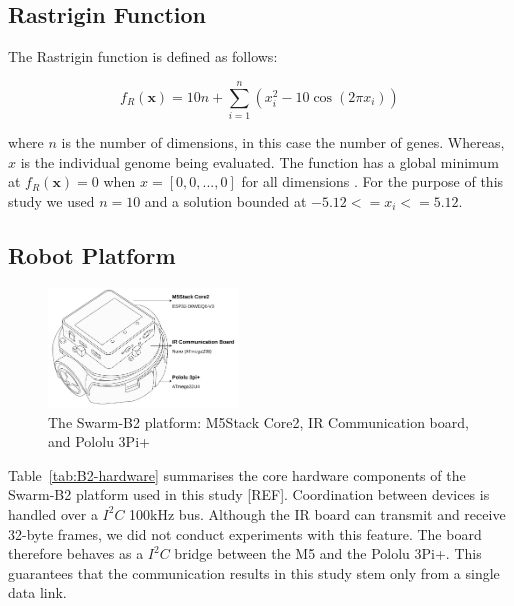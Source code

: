\documentclass[conference]{IEEEtran}
\begin{document}
\subsection{Rastrigin Function}

The Rastrigin function is defined as follows:

\begin{equation}\label{eq:rastrigin}
f_R(\mathbf{x}) = 10n + \sum_{i=1}^{n} \left(x_i^2 - 10\cos(2\pi x_i)\right)
\end{equation}

where $n$ is the number of dimensions, in this case the number of genes. Whereas, $x$ is the individual genome being evaluated. The function has a global minimum at \( f_R(\mathbf{x}) = 0 \) when $x = [0, 0, ..., 0]$ for all dimensions \cite{rucinski_impact_2010}. For the purpose of this study we used $n = 10$ and a solution bounded at $-5.12<=x_i<=5.12$.

\subsection{Robot Platform}\label{sec:robot_platform}
\begin{figure}[h]
    \centering
    \includegraphics[width=0.45\textwidth]{B2.pdf}
    \caption{The Swarm-B2 platform: M5Stack Core2, IR Communication board, and Pololu 3Pi+}
    \label{fig:B2}
\end{figure}

Table~\ref{tab:B2-hardware} summarises the core hardware components of the Swarm-B2 platform used in this study [REF]. Coordination between devices is handled over a $I^2C$ 100kHz bus. Although the IR board can transmit and receive 32-byte frames, we did not conduct experiments with this feature. The board therefore behaves as a $I^2C$ bridge between the M5 and the Pololu 3Pi+. This guarantees that the communication results in this study stem only from a single data link.\\
\end{document}
